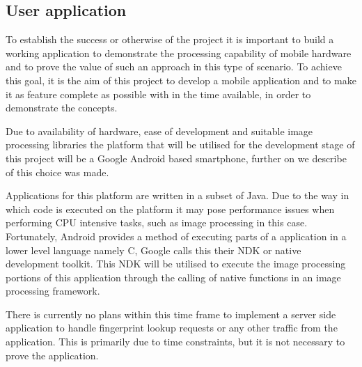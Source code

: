 \subsection*{User application}
To establish the success or otherwise of the project it is important to build a working application to demonstrate the processing capability of mobile hardware and to prove the value of such an approach in this type of scenario. To achieve this goal, it is the aim of this project to develop a mobile application and to make it as feature complete as possible with in the time available, in order to demonstrate the concepts.

Due to availability of hardware, ease of development and suitable image processing libraries the platform that will be utilised for the development stage of this project will be a Google Android\textsuperscript{\texttrademark} based smartphone, further on we describe of this choice was made.

Applications for this platform are written in a subset of Java\textsuperscript{\texttrademark}. Due to the way in which code is executed on the platform it may pose performance issues when performing CPU intensive tasks, such as image processing in this case. Fortunately, Android provides a method of executing parts of a application in a lower level language namely C, Google calls this their NDK or native development toolkit. This NDK will be utilised to execute the image processing portions of this application through the calling of native functions in an image processing framework.

There is currently no plans within this time frame to implement a server side application to handle fingerprint lookup requests or any other traffic from the application. This is primarily due to time constraints, but it is not necessary to prove the application.
